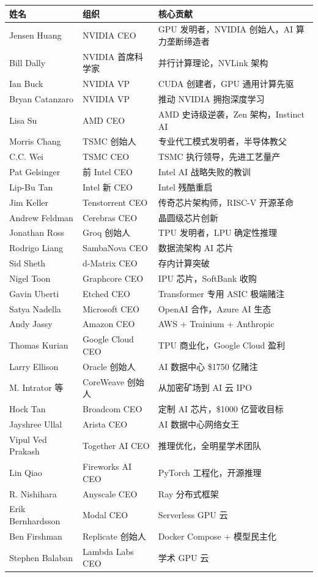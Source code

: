 \begin{keybox}[本章关键人物索引]
\small
\begin{tabularx}{\textwidth}{l l X}
\toprule
\rowcolor{figLightGray}
\textbf{姓名} & \textbf{组织} & \textbf{核心贡献} \\
\midrule
Jensen Huang & NVIDIA CEO & GPU 发明者，NVIDIA 创始人，AI 算力垄断缔造者 \\
Bill Dally & NVIDIA 首席科学家 & 并行计算理论，NVLink 架构 \\
Ian Buck & NVIDIA VP & CUDA 创建者，GPU 通用计算先驱 \\
Bryan Catanzaro & NVIDIA VP & 推动 NVIDIA 拥抱深度学习 \\
Lisa Su & AMD CEO & AMD 史诗级逆袭，Zen 架构，Instinct AI \\
Morris Chang & TSMC 创始人 & 专业代工模式发明者，半导体教父 \\
C.C. Wei & TSMC CEO & TSMC 执行领导，先进工艺量产 \\
Pat Gelsinger & 前 Intel CEO & Intel AI 战略失败的教训 \\
Lip-Bu Tan & Intel 新 CEO & Intel 残酷重启 \\
Jim Keller & Tenstorrent CEO & 传奇芯片架构师，RISC-V 开源革命 \\
Andrew Feldman & Cerebras CEO & 晶圆级芯片创新 \\
Jonathan Ross & Groq 创始人 & TPU 发明者，LPU 确定性推理 \\
Rodrigo Liang & SambaNova CEO & 数据流架构 AI 芯片 \\
Sid Sheth & d-Matrix CEO & 存内计算突破 \\
Nigel Toon & Graphcore CEO & IPU 芯片，SoftBank 收购 \\
Gavin Uberti & Etched CEO & Transformer 专用 ASIC 极端赌注 \\
Satya Nadella & Microsoft CEO & OpenAI 合作，Azure AI 生态 \\
Andy Jassy & Amazon CEO & AWS + Trainium + Anthropic \\
Thomas Kurian & Google Cloud CEO & TPU 商业化，Google Cloud 盈利 \\
Larry Ellison & Oracle 创始人 & AI 数据中心 \$1750 亿赌注 \\
M. Intrator 等 & CoreWeave 创始人 & 从加密矿场到 AI 云 IPO \\
Hock Tan & Broadcom CEO & 定制 AI 芯片，\$1000 亿营收目标 \\
Jayshree Ullal & Arista CEO & AI 数据中心网络女王 \\
Vipul Ved Prakash & Together AI CEO & 推理优化，全明星学术团队 \\
Lin Qiao & Fireworks AI CEO & PyTorch 工程化，开源推理 \\
R. Nishihara & Anyscale CEO & Ray 分布式框架 \\
Erik Bernhardsson & Modal CEO & Serverless GPU 云 \\
Ben Firshman & Replicate 创始人 & Docker Compose + 模型民主化 \\
Stephen Balaban & Lambda Labs CEO & 学术 GPU 云 \\
\bottomrule
\end{tabularx}
\end{keybox}
